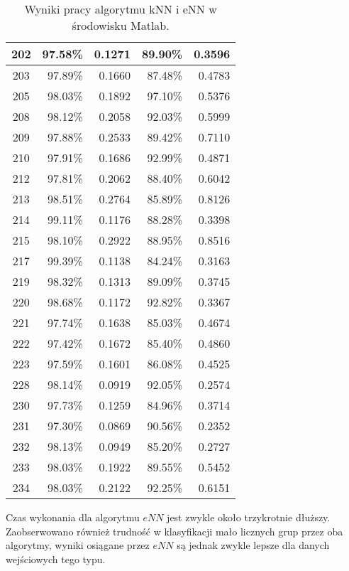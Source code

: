 \begin{table}[!htb]
\begin{tabular}{|c|r|r|r|r|}
\hline
202 &  97.58\% & 0.1271 &  89.90\% & 0.3596 \\ 
\hline
203 &  97.89\% & 0.1660 &  87.48\% & 0.4783 \\ 
\hline
205 &  98.03\% & 0.1892 &  97.10\% & 0.5376 \\ 
\hline
208 &  98.12\% & 0.2058 &  92.03\% & 0.5999 \\ 
\hline
209 &  97.88\% & 0.2533 &  89.42\% & 0.7110 \\ 
\hline
210 &  97.91\% & 0.1686 &  92.99\% & 0.4871 \\ 
\hline
212 &  97.81\% & 0.2062 &  88.40\% & 0.6042 \\ 
\hline
213 &  98.51\% & 0.2764 &  85.89\% & 0.8126 \\ 
\hline
214 &  99.11\% & 0.1176 &  88.28\% & 0.3398 \\ 
\hline
215 &  98.10\% & 0.2922 &  88.95\% & 0.8516 \\ 
\hline
217 &  99.39\% & 0.1138 &  84.24\% & 0.3163 \\ 
\hline
219 &  98.32\% & 0.1313 &  89.09\% & 0.3745 \\ 
\hline
220 &  98.68\% & 0.1172 &  92.82\% & 0.3367 \\ 
\hline
221 &  97.74\% & 0.1638 &  85.03\% & 0.4674 \\ 
\hline
222 &  97.42\% & 0.1672 &  85.40\% & 0.4860 \\ 
\hline
223 &  97.59\% & 0.1601 &  86.08\% & 0.4525 \\ 
\hline
228 &  98.14\% & 0.0919 &  92.05\% & 0.2574 \\ 
\hline
230 &  97.73\% & 0.1259 &  84.96\% & 0.3714 \\ 
\hline
231 &  97.30\% & 0.0869 &  90.56\% & 0.2352 \\ 
\hline
232 &  98.13\% & 0.0949 &  85.20\% & 0.2727 \\ 
\hline
233 &  98.03\% & 0.1922 &  89.55\% & 0.5452 \\ 
\hline
234 &  98.03\% & 0.2122 &  92.25\% & 0.6151 \\ 
\hline
		
	\end{tabular}
	\caption{Wyniki pracy algorytmu kNN i eNN w środowisku Matlab.}
	\label{tab:matlab-skutecznosc}
	
\end{table}

Czas wykonania dla algorytmu $eNN$ jest zwykle około trzykrotnie dłuższy. Zaobserwowano również trudność w klasyfikacji mało licznych grup przez oba algorytmy, wyniki osiągane przez $eNN$ są jednak zwykle lepsze dla danych wejściowych tego typu.